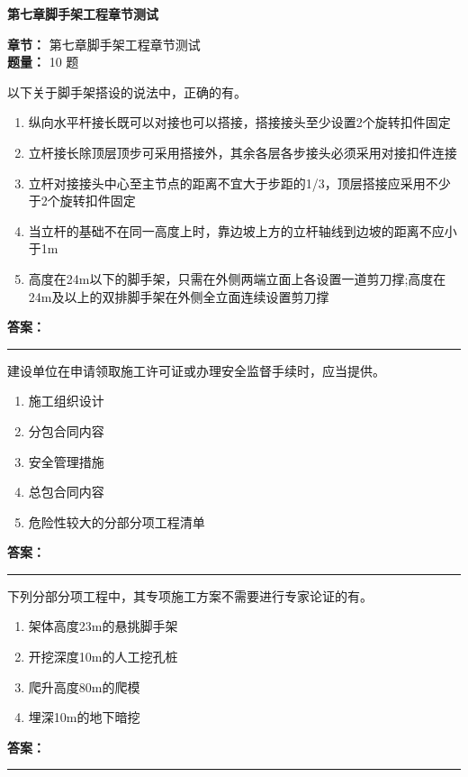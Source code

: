 \documentclass[UTF8,fontset=fandol,11pt]{ctexart}
\newcommand{\chaptertitle}[1]{\vspace{0.5em}\begin{tcolorbox}[enhanced,colback=deepblue,colframe=deepblue,arc=2mm,boxrule=0pt]\begin{center}\Large\bfseries\color{white}#1\end{center}\end{tcolorbox}\vspace{0.5em}}
\newcommand{\answerline}{\textcolor{answerred}{\rule{2.4cm}{0.7pt}}}
\begin{document}
\chaptertitle{第七章脚手架工程章节测试}
\begin{mainbox}
\textbf{\textcolor{mainblue}{章节：}} 第七章脚手架工程章节测试\\
\textbf{\textcolor{answerred}{题量：}} 10 题
\end{mainbox}

\begin{quizbox}[title={第 1 题}]
以下关于脚手架搭设的说法中，正确的有。\\
\begin{enumerate}[label=\Alph*.]
\item 纵向水平杆接长既可以对接也可以搭接，搭接接头至少设置2个旋转扣件固定
\item 立杆接长除顶层顶步可采用搭接外，其余各层各步接头必须采用对接扣件连接
\item 立杆对接接头中心至主节点的距离不宜大于步距的1/3，顶层搭接应采用不少于2个旋转扣件固定
\item 当立杆的基础不在同一高度上时，靠边坡上方的立杆轴线到边坡的距离不应小于1m
\item 高度在24m以下的脚手架，只需在外侧两端立面上各设置一道剪刀撑;高度在24m及以上的双排脚手架在外侧全立面连续设置剪刀撑
\end{enumerate}
\textbf{\textcolor{answerred}{答案：}} \answerline
\end{quizbox}

\begin{quizbox}[title={第 2 题}]
建设单位在申请领取施工许可证或办理安全监督手续时，应当提供。\\
\begin{enumerate}[label=\Alph*.]
\item 施工组织设计
\item 分包合同内容
\item 安全管理措施
\item 总包合同内容
\item 危险性较大的分部分项工程清单
\end{enumerate}
\textbf{\textcolor{answerred}{答案：}} \answerline
\end{quizbox}

\begin{quizbox}[title={第 3 题}]
下列分部分项工程中，其专项施工方案不需要进行专家论证的有。\\
\begin{enumerate}[label=\Alph*.]
\item 架体高度23m的悬挑脚手架
\item 开挖深度10m的人工挖孔桩
\item 爬升高度80m的爬模
\item 埋深10m的地下暗挖
\end{enumerate}
\textbf{\textcolor{answerred}{答案：}} \answerline
\end{quizbox}
\end{document}
